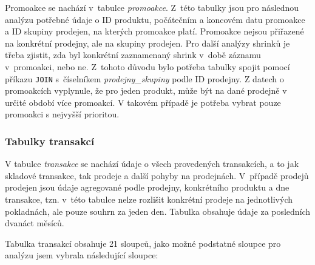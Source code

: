 Promoakce se nachází v~tabulce \emph{promoakce}. Z~této tabulky jsou pro následnou analýzu potřebné údaje o ID produktu, počátečním a koncovém datu promoakce a ID skupiny prodejen, na kterých promoakce platí. Promoakce nejsou přiřazené na konkrétní prodejny, ale na skupiny prodejen. Pro další analýzy shrinků je třeba zjistit, zda byl konkrétní zaznamenaný shrink v~době záznamu v~promoakci, nebo ne. Z~tohoto důvodu bylo potřeba tabulky spojit pomocí příkazu \texttt{JOIN} s~číselníkem \emph{prodejny\_skupiny} podle ID prodejny. Z datech o promoakcích vyplynule, že pro jeden produkt, může být na dané prodejně v určité období více promoakcí. V takovém případě je potřeba vybrat pouze promoakci s nejvyšší prioritou.

\subsubsection{Tabulky transakcí}
V tabulce \emph{transakce} se nachází údaje o všech provedených transakcích, a to jak skladové transakce, tak prodeje a další pohyby na prodejnách. V~případě prodejů prodejen jsou údaje agregované podle prodejny, konkrétního produktu a dne transakce, tzn. v~této tabulce nelze rozlišit konkrétní prodeje na jednotlivých pokladnách, ale pouze souhrn za jeden den. Tabulka obsahuje údaje za posledních dvanáct měsíců.

Tabulka transakcí obsahuje 21 sloupců, jako možné podstatné sloupce pro analýzu jsem vybrala následující sloupce:

